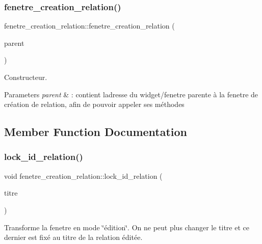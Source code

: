 \subsubsection{\texorpdfstring{fenetre\+\_\+creation\+\_\+relation()}{fenetre\_creation\_relation()}}
{\footnotesize\ttfamily fenetre\+\_\+creation\+\_\+relation\+::fenetre\+\_\+creation\+\_\+relation (\begin{DoxyParamCaption}\item[{Q\+Widget $\ast$}]{parent }\end{DoxyParamCaption})}



Constructeur. 


\begin{DoxyParams}{Parameters}
{\em parent} & \+: contient l\textquotesingle{}adresse du widget/fenetre parente à la fenetre de création de relation, afin de pouvoir appeler ses méthodes \\
\hline
\end{DoxyParams}


\subsection{Member Function Documentation}
\mbox{\label{classfenetre__creation__relation_a83c62031d4d8d973aca33e38d9079c49}} 
\subsubsection{\texorpdfstring{lock\+\_\+id\+\_\+relation()}{lock\_id\_relation()}}
{\footnotesize\ttfamily void fenetre\+\_\+creation\+\_\+relation\+::lock\+\_\+id\+\_\+relation (\begin{DoxyParamCaption}\item[{std\+::string}]{titre }\end{DoxyParamCaption})\hspace{0.3cm}{\ttfamily [inline]}}



Transforme la fenetre en mode \char`\"{}édition\char`\"{}. On ne peut plus changer le titre et ce dernier est fixé au titre de la relation éditée. 


